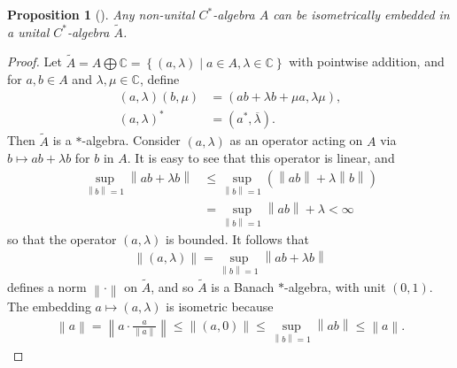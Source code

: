 \documentclass[11pt,a4paper]{report}
\theoremstyle{plain}
\newtheorem*{prop*}{Proposition}
\theoremstyle{definition}
\newcommand{\1}{\mathbbm{1}}
\newcommand{\C}{\mathbb{C}}
\renewcommand{\oplus}{\textstyle\bigoplus}
\begin{document}
\begin{prop*}[{\cite[I.1.3]{davidson96}}]
	Any non-unital $C^\ast$-algebra $A$ can be isometrically embedded in a unital 
	$C^\ast$-algebra $\tilde{A}$.

\end{prop*}
\begin{proof}
	Let $\tilde{A} = A \oplus \C = \left\{(a,\lambda) \mid a\in A, \lambda \in 
	\C\right\}$  with pointwise addition, and for $a, b \in A$ and $\lambda,\mu 
	\in \C$, define
	\begin{align*}
		(a,\lambda) (b,\mu) &= (ab+\lambda b + \mu a, \lambda \mu),								\\
		(a,\lambda)^\ast &= (a^\ast,\overline{\lambda}).
	\end{align*}
	Then $\tilde{A}$ is a $\ast$-algebra. 
	Consider $(a,\lambda)$ as an operator acting on $A$ via $b\mapsto ab+\lambda b$ 
	for $b$ in $A$. It is easy to see that this operator is linear, and 
	\begin{align*}
				\sup_{\left\|b\right\|=1}\left\|ab+\lambda b\right\| 
		&\leq 	\sup_{\left\|b\right\|=1} (\left\|ab\right\|+ \lambda\left\|b\right\|)			\\
		&=		\sup_{\left\|b\right\|=1} \left\|ab\right\|+ \lambda < \infty
	\end{align*}
	so that the operator $(a,\lambda)$ is bounded. It follows that
	\begin{align*}
		\left\|(a,\lambda)\right\| = \sup_{\left\|b\right\|=1}\left\|ab+\lambda b\right\|
	\end{align*}
	defines a norm $\left\|\cdot\right\|$ on $\tilde{A}$, and so $\tilde{A}$ is a 
	Banach $\ast$-algebra, with unit $(0,1)$.
	The embedding $a\mapsto(a,\lambda)$ is isometric because 
	\begin{align*}
		\left\|a\right\| = \left\|a\cdot\frac{a}{\left\|a\right\|}\right\| 
						 \leq \left\|(a,0)\right\| 
						 \leq \sup_{\left\|b\right\|=1}{\left\|ab\right\|} 
						 \leq \left\|a\right\|.
	\end{align*}
	

\end{proof}
\end{document}
